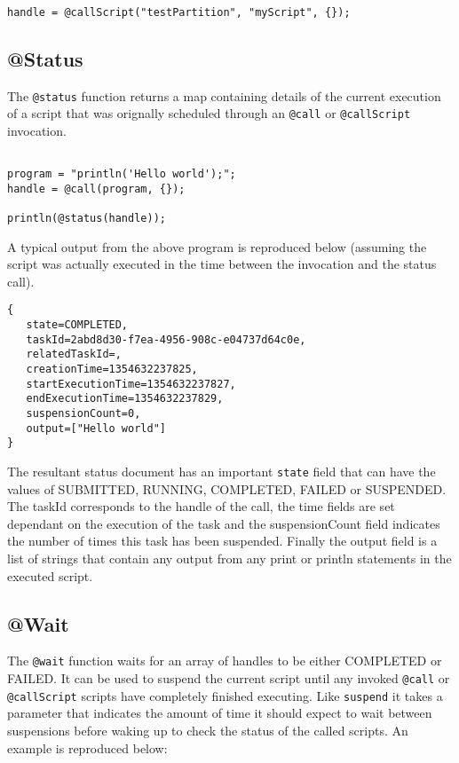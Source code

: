 \begin{lstlisting}[caption={Example @CallScript}]

handle = @callScript("testPartition", "myScript", {});

\end{lstlisting}

\subsection{@Status}

The \verb+@status+ function returns a map containing details of the current execution of a script that was orignally scheduled through an \verb+@call+ or \verb+@callScript+ invocation.

\begin{lstlisting}[caption={Example @Status}]

program = "println('Hello world');";
handle = @call(program, {});

println(@status(handle));

\end{lstlisting}

A typical output from the above program is reproduced below (assuming the script was actually executed in the time between the invocation and the status call).

\begin{Verbatim}
{
   state=COMPLETED,
   taskId=2abd8d30-f7ea-4956-908c-e04737d64c0e,
   relatedTaskId=,
   creationTime=1354632237825,
   startExecutionTime=1354632237827,
   endExecutionTime=1354632237829,
   suspensionCount=0,
   output=["Hello world"]
}
\end{Verbatim}

The resultant status document has an important \verb+state+ field that can have the values of SUBMITTED, RUNNING, COMPLETED, FAILED or SUSPENDED. The taskId corresponds to the handle of the call, the time fields are set dependant on the execution of the task and the suspensionCount field indicates the number of times this task has been suspended. Finally the output field is a list of strings that contain any output from any print or println statements in the executed script.

\subsection{@Wait}
The \verb+@wait+ function waits for an array of handles to be either COMPLETED or FAILED. It can be used to suspend the current script until any invoked \verb+@call+ or \verb+@callScript+ scripts have completely finished executing. Like \verb+suspend+ it takes a parameter that indicates the amount of time it should expect to wait between suspensions before waking up to check the status of the called scripts. An example is reproduced below:

